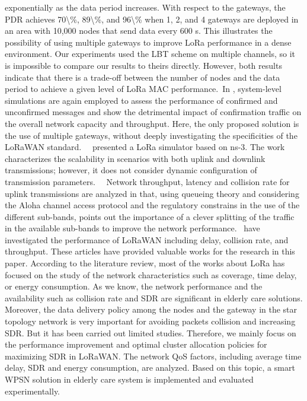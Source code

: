 exponentially as the data period increases. With respect to the gateways, the PDR achieves 70\textbackslash\%, 89\textbackslash\%, and 96\textbackslash\% when 1, 2, and 4 gateways are deployed in an area with 10,000 nodes that send data every 600 s. This illustrates the possibility of using multiple gateways to improve LoRa performance in a dense environment. Our experiments used the LBT scheme on multiple channels, so it is impossible to compare our results to theirs directly. However, both results indicate that there is a trade-off between the number of nodes and the data period to achieve a given level of LoRa MAC performance.~In \cite{abeele_scalability_2017}, system-level simulations are again employed to assess the performance of confirmed and unconfirmed messages and show the detrimental impact of confirmation traffic on the overall network capacity and throughput. Here, the only proposed solution is the use of multiple gateways, without deeply investigating the specificities of the LoRaWAN standard.~~\citet{abeele_scalability_2017} presented a LoRa simulator based on ns-3. The work characterizes the scalability in scenarios with both uplink and downlink transmissions; however, it does not consider dynamic configuration of transmission parameters.~~   \newline 
 \cite{sorensen_analysis_2017}   Network throughput, latency and collision rate for uplink transmissions are analyzed in \cite{sorensen_analysis_2017} that, using queueing theory and considering the Aloha channel access protocol and the regulatory constrains in the use of the different sub-bands, points out the importance of a clever splitting of the traffic in the available sub-bands to improve the network performance.~\citet{sorensen_analysis_2017} have investigated the performance of LoRaWAN including delay, collision rate, and throughput. These articles have provided valuable works for the research in this paper. According to the literature review, most of the works about LoRa has focused on the study of the network characteristics such as coverage, time delay, or energy consumption. As we know, the network performance and the availability such as collision rate and SDR are significant in elderly care solutions. Moreover, the data delivery policy among the nodes and the gateway in the star topology network is very important for avoiding packets collision and increasing SDR. But it has been carried out limited studies. Therefore, we mainly focus on the performance improvement and optimal cluster allocation policies for maximizing SDR in LoRaWAN. The network QoS factors, including average time delay, SDR and energy consumption, are analyzed. Based on this topic, a smart WPSN solution in elderly care system is implemented and evaluated experimentally.~~   \newline 
